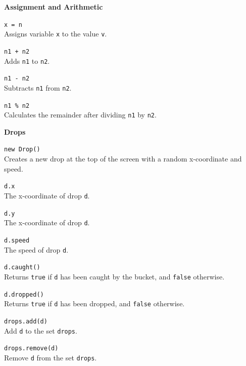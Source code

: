 \documentclass[10pt,twocolumn]{article}
\begin{document}
\bigskip

\noindent\textbf{\large Assignment and Arithmetic}
\begin{description}

\item{\texttt{x = n}} \ \\[.25em]
  Assigns variable \texttt{x} to the value \texttt{v}.

\item{\texttt{n1 + n2}} \ \\[.25em]
  Adds \texttt{n1} to \texttt{n2}. 

\item{\texttt{n1 - n2}} \ \\[.25em]
  Subtracts \texttt{n1} from \texttt{n2}. 

\item{\texttt{n1 \% n2}}\ \\[.25em]
  Calculates the remainder after dividing \texttt{n1} by \texttt{n2}. 
\end{description}

\bigskip

\noindent\textbf{\large Drops}
\begin{description}

\item{\texttt{new Drop()}}\ \\[.25em]
% 
Creates a new drop at the top of the screen with a random x-coordinate and speed. 

\item{\texttt{d.x}}\ \\[.25em]
% 
The x-coordinate of drop \texttt{d}.

\item{\texttt{d.y}}\ \\[.25em]
% 
The x-coordinate of drop \texttt{d}.
\item{\texttt{d.speed}}\ \\[.25em]
% 
The speed of drop \texttt{d}.

\item{\texttt{d.caught()}}\ \\[.25em]
% 
Returns \texttt{true} if \texttt{d} has been caught by the bucket, and
\texttt{false} otherwise.

\item{\texttt{d.dropped()}}\ \\[.25em]
% 
Returns \texttt{true} if \texttt{d} has been dropped, and
\texttt{false} otherwise.

\item{\texttt{drops.add(d)}}\ \\[.25em]
% 
Add \texttt{d} to the set \texttt{drops}.

\item{\texttt{drops.remove(d)}}\ \\[.25em]
% 
Remove \texttt{d} from the set \texttt{drops}.

\end{description}
\end{document}
